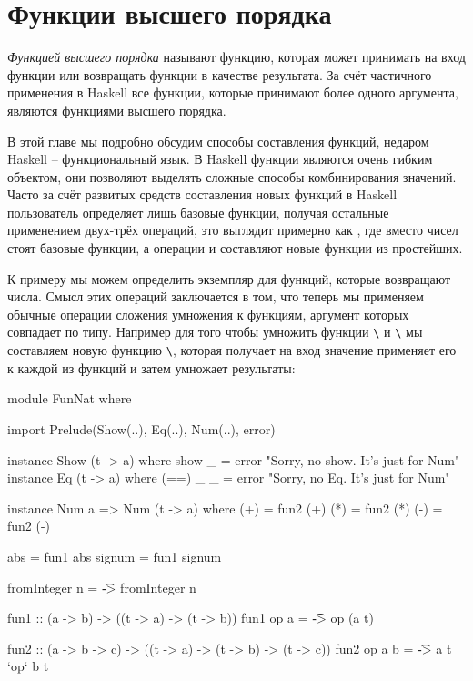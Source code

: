 \setcounter{chapter}{4}
\chapter{Функции высшего порядка}

\emph{Функцией высшего порядка} называют функцию, которая может
принимать на вход функции или возвращать функции в качестве результата.
За счёт частичного применения в Haskell все функции,
которые принимают более одного аргумента, являются функциями
высшего порядка. 

В этой главе мы подробно обсудим способы 
составления функций, недаром Haskell -- функциональный язык.
В Haskell функции являются очень гибким объектом, они позволяют
выделять сложные способы комбинирования значений. Часто за счёт
развитых средств составления новых функций в Haskell пользователь 
определяет лишь базовые функции, получая остальные 
применением двух-трёх операций, это выглядит примерно как ,
где вместо чисел стоят базовые функции, а операции \In{+} и \In{*} составляют
новые функции из простейших.

К примеру мы можем определить экземпляр  для функций,
которые возвращают числа. Смысл этих операций заключается
в том, что теперь мы применяем обычные операции сложения умножения
к функциям, аргумент которых совпадает по типу. Например для того 
чтобы умножить функции \verb!\! и
\verb!\! мы составляем новую функцию
\verb!\!, которая получает на
вход значение  применяет его к каждой из функций 
и затем умножает результаты:

\begin{code}
module FunNat where

import Prelude(Show(..), Eq(..), Num(..), error)

instance Show (t -> a) where
    show _ = error "Sorry, no show. It's just for Num"
instance Eq (t -> a) where
    (==) _ _ = error "Sorry, no Eq. It's just for Num"

instance Num a => Num (t -> a) where
    (+) = fun2 (+)
    (*) = fun2 (*)
    (-) = fun2 (-)

    abs      = fun1 abs
    signum   = fun1 signum

    fromInteger n = \t -> fromInteger n

fun1 :: (a -> b) -> ((t -> a) -> (t -> b))
fun1 op a = \t -> op (a t)

fun2 :: (a -> b -> c) -> ((t -> a) -> (t -> b) -> (t -> c))
fun2 op a b = \t -> a t `op` b t
\end{code}


